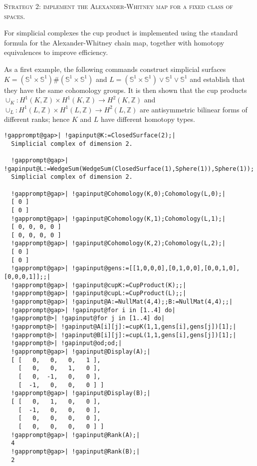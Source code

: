 \documentclass[a4paper,11pt]{report}
\begin{document}
{{\textsc{Strategy 2: implement the Alexander-Whitney map for a fixed class of spaces.} 

For simplicial complexes the cup product is implemented using the standard
formula for the Alexander-Whitney chain map, together with homotopy
equivalences to improve efficiency. 

As a first example, the following commands construct simplicial surfaces $K=(\mathbb S^1 \times \mathbb S^1) \# (\mathbb S^1 \times \mathbb S^1)$ and $L=(\mathbb S^1 \times \mathbb S^1) \vee \mathbb S^1 \vee \mathbb S^1$ and establish that they have the same cohomology groups. It is then shown that
the cup products $\cup_K\colon H^1(K,\mathbb Z)\times H^1(K,\mathbb Z) \rightarrow H^2(K,\mathbb
Z)$ and $\cup_L\colon H^1(L,\mathbb Z)\times H^1(L,\mathbb Z) \rightarrow H^2(L,\mathbb
Z)$ are antisymmetric bilinear forms of different ranks; hence $K$ and $L$ have different homotopy types. 
\begin{Verbatim}[commandchars=!@|,fontsize=\small,frame=single,label=Example]
  !gapprompt@gap>| !gapinput@K:=ClosedSurface(2);|
  Simplicial complex of dimension 2.
  
  !gapprompt@gap>| !gapinput@L:=WedgeSum(WedgeSum(ClosedSurface(1),Sphere(1)),Sphere(1));|
  Simplicial complex of dimension 2.
  
  !gapprompt@gap>| !gapinput@Cohomology(K,0);Cohomology(L,0);|
  [ 0 ]
  [ 0 ]
  !gapprompt@gap>| !gapinput@Cohomology(K,1);Cohomology(L,1);|
  [ 0, 0, 0, 0 ]
  [ 0, 0, 0, 0 ]
  !gapprompt@gap>| !gapinput@Cohomology(K,2);Cohomology(L,2);|
  [ 0 ]
  [ 0 ]
  !gapprompt@gap>| !gapinput@gens:=[[1,0,0,0],[0,1,0,0],[0,0,1,0],[0,0,0,1]];;|
  !gapprompt@gap>| !gapinput@cupK:=CupProduct(K);;|
  !gapprompt@gap>| !gapinput@cupL:=CupProduct(L);;|
  !gapprompt@gap>| !gapinput@A:=NullMat(4,4);;B:=NullMat(4,4);;|
  !gapprompt@gap>| !gapinput@for i in [1..4] do|
  !gapprompt@>| !gapinput@for j in [1..4] do|
  !gapprompt@>| !gapinput@A[i][j]:=cupK(1,1,gens[i],gens[j])[1];|
  !gapprompt@>| !gapinput@B[i][j]:=cupL(1,1,gens[i],gens[j])[1];|
  !gapprompt@>| !gapinput@od;od;|
  !gapprompt@gap>| !gapinput@Display(A);|
  [ [   0,   0,   0,   1 ],
    [   0,   0,   1,   0 ],
    [   0,  -1,   0,   0 ],
    [  -1,   0,   0,   0 ] ]
  !gapprompt@gap>| !gapinput@Display(B);|
  [ [   0,   1,   0,   0 ],
    [  -1,   0,   0,   0 ],
    [   0,   0,   0,   0 ],
    [   0,   0,   0,   0 ] ]
  !gapprompt@gap>| !gapinput@Rank(A);|
  4
  !gapprompt@gap>| !gapinput@Rank(B);|
  2
  
\end{Verbatim}
 

}}
\end{document}
